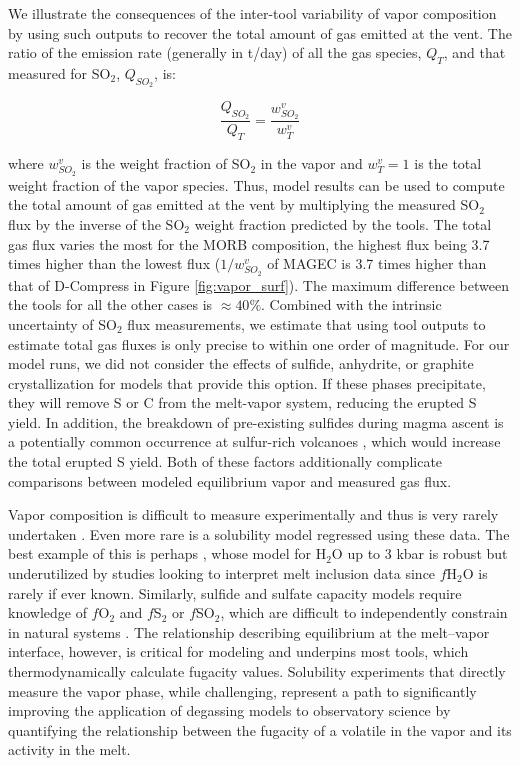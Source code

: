 \documentclass[draft, english]{volcanica-template}
\begin{document}
We illustrate the consequences of the inter-tool variability of vapor composition by using such outputs to recover the total amount of gas emitted at the vent. The ratio of the emission rate (generally in t/day) of all the gas species, $Q_T$, and that measured for SO$_2$, $Q_{SO_2}$, is:

\begin{equation}
\frac{Q_{SO_2}}{Q_T} = \frac{w_{SO_2}^v}{w_T^v}
\end{equation}

where $w_{SO_2}^v$ is the weight fraction of SO$_2$ in the vapor and $w_T^v=1$ is the total weight fraction of the vapor species. Thus, model results can be used to compute the total amount of gas emitted at the vent by multiplying the measured SO$_2$ flux by the inverse of the SO$_2$ weight fraction predicted by the tools. The total gas flux varies the most for the MORB composition, the highest flux being 3.7 times higher than the lowest flux ($1/w_{SO_2}^v$ of MAGEC is 3.7 times higher than that of D-Compress in Figure \ref{fig:vapor_surf}). The maximum difference between the tools for all the other cases is $\approx 40\%$. Combined with the intrinsic uncertainty of SO$_2$ flux measurements, we estimate that using tool outputs to estimate total gas fluxes is only precise to within one order of magnitude. For our model runs, we did not consider the effects of sulfide, anhydrite, or graphite crystallization for models that provide this option. If these phases precipitate, they will remove S or C from the melt-vapor system, reducing the erupted S yield. In addition, the breakdown of pre-existing sulfides during magma ascent is a potentially common occurrence at sulfur-rich volcanoes \parencite{larocque2000, mungall2015}, which would increase the total erupted S yield. Both of these factors additionally complicate comparisons between modeled equilibrium vapor and measured gas flux.

Vapor composition is difficult to measure experimentally and thus is very rarely undertaken \parencite{eggler1979solubility-b9e, holloway1986, jakobsson1986, taylor1989, pawley1992, jakobsson1994, iacovino2013, o2002sulfide, Oneill2022, gorojovsky2026solubility, boulliung2022so2, boulliung2023sulfur, newcombe2017solubility}. Even more rare is a solubility model regressed using these data. The best example of this is perhaps \textcite{Moore1998}, whose model for H$_2$O up to 3 kbar is robust but underutilized by studies looking to interpret melt inclusion data since $f$H$_2$O is rarely if ever known. Similarly, sulfide and sulfate capacity models require knowledge of $f$O$_2$ and $f$S$_2$ or $f$SO$_2$, which are difficult to independently constrain in natural systems \parencite{ONeill2021, Oneill2022, boulliung2022so2, boulliung2023sulfur, thomas-wood2026, gorojovsky2026solubility}. The relationship describing equilibrium at the melt–vapor interface, however, is critical for modeling and underpins most tools, which thermodynamically calculate fugacity values. Solubility experiments that directly measure the vapor phase, while challenging, represent a path to significantly improving the application of degassing models to observatory science by quantifying the relationship between the fugacity of a volatile in the vapor and its activity in the melt.
\end{document}
